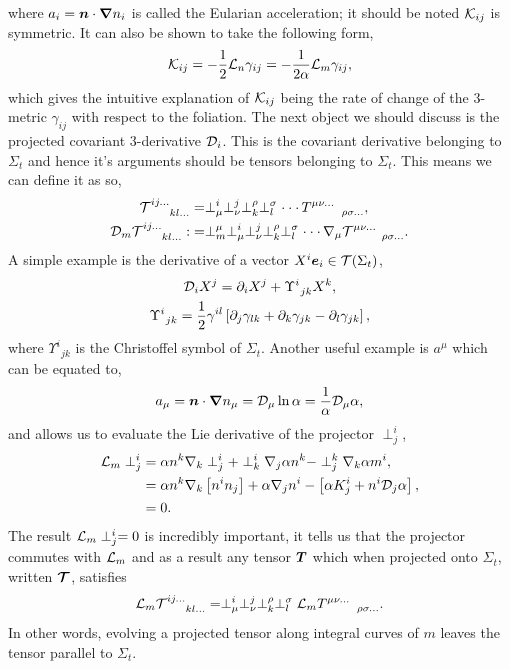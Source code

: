 where $a_i = \boldsymbol{n}\cdot\boldsymbol{\nabla} n_i $ is called the Eularian acceleration; it should be noted $\mathcal{K}_{ij}$ is symmetric. It can also be shown to take the following form,
\begin{equation}\label{nr:eq:lmL=alnK} \mathcal{K}_{ij} = -\frac{1}{2}\mathcal{L}_n \gamma_{ij} = -\frac{1}{2\alpha}\mathcal{L}_m \gamma_{ij},\end{equation}
which gives the intuitive explanation of $\mathcal{K}_{ij}$ being the rate of change of the 3-metric $\gamma_{ij}$ with respect to the foliation. 
The next object we should discuss is the projected covariant 3-derivative $\mathcal{D}_i$. This is the covariant derivative belonging to $\Sigma_t$ and hence it's arguments should be tensors belonging to $\Sigma_t$. This means we can define it as so,
\begin{align} {\mathcal{T}}^{ij ...}_{\;\;\;\;\;\;\;kl ...} &=\perp^{i}_{\mu}\perp^{j}_{\nu}\perp^{\rho}_{k}\perp^{\sigma}_{l}\cdot\cdot\cdot\, T^{\mu\nu ...}_{\;\;\;\;\;\;\;\;\;\;\rho\sigma ...},\\
  \mathcal{D}_m  {\mathcal{T}}^{ij ...}_{\;\;\;\;\;\;\;kl ...} :&=   \perp^\mu_m  \perp^{i}_{\mu}\perp^{j}_{\nu}\perp^{\rho}_{k}\perp^{\sigma}_{l}\cdot\cdot\cdot\, \nabla_\mu{\mathcal{T}}^{\mu\nu ...}_{\;\;\;\;\;\;\;\;\;\;\rho\sigma ...}.\end{align}
A simple example is the derivative of a vector $X^i \boldsymbol{e}_i \in \mathcal{T}(\Sigma_t)$,
\begin{gather} \mathcal{D}_i X^j = \partial_i X^j + \Upsilon^i_{\;\,jk}X^k,\\
\Upsilon^i_{\;\,jk} = \frac{1}{2}\gamma^{il}\left[ \partial_{j}\gamma_{lk} + \partial_{k}\gamma_{jk} -\partial_{l}\gamma_{jk} \right],\end{gather}
where $\Upsilon^i_{\;\,jk}$ is the Christoffel symbol of $\Sigma_t$. Another useful example is $a^\mu$ which can be equated to,
\begin{equation}\label{nr:eq:dlnalpha} a_\mu = \boldsymbol{n}\cdot \boldsymbol{\nabla} n_\mu = \mathcal{D}_\mu \ln \alpha = \frac{1}{\alpha}\mathcal{D}_\mu \alpha,\end{equation}
and allows us to evaluate the Lie derivative of the projector $\perp^i_j$,
\begin{align}
\mathcal{L}_m \perp^i_j &= \alpha n^k \nabla_k \perp^i_j + \perp^i_k \nabla_j \alpha n^k - \perp^k_j \nabla_k \alpha m^i,  \\
&= \alpha n^k \nabla_k \left[ n^i n_j\right]  + \alpha \nabla_j n^i - \left[ \alpha K_j^i + n^i \mathcal{D}_j \alpha\right], \\
&= 0.
\end{align}
The result $\mathcal{L}_m \perp^i_j=0$ is incredibly important, it tells us that the projector commutes with $\mathcal{L}_m$ and as a result any tensor $\boldsymbol{T}$ which when projected onto $\Sigma_t$, written $\boldsymbol{\mathcal{T}}$, satisfies
\begin{equation}  \label{nr:eq:LmT}\mathcal{L}_m {\mathcal{T}}^{ij ...}_{\;\;\;\;\;\;\;kl ...} =   \perp^{i}_{\mu}\perp^{j}_{\nu}\perp^{\rho}_{k}\perp^{\sigma}_{l}\mathcal{L}_m{{T}}^{\mu\nu ...}_{\;\;\;\;\;\;\;\;\;\;\rho\sigma ...}.\end{equation} 
In other words, evolving a projected tensor along integral curves of $m$ leaves the tensor parallel to $\Sigma_t$.




